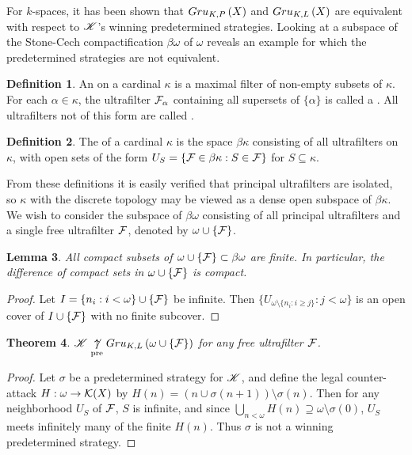 \documentclass{amsart}
\newtheorem{theorem}{Theorem}[section]
\newtheorem{lemma}[theorem]{Lemma}
\theoremstyle{definition}
\newtheorem{definition}[theorem]{Definition}
\begin{document}
For \(k\)-spaces, it has been shown that \(Gru_{K,P}\left({X}\right)\) and \(Gru_{K,L}\left({X}\right)\)
are equivalent with respect to \(\mathscr{K}\)'s winning predetermined strategies.
Looking at a subspace of the Stone-Cech compactification \(\beta\omega\) of
\(\omega\) reveals an example for which the predetermined strategies are not
equivalent.

\begin{definition}
  An  on a cardinal \(\kappa\) is a maximal filter of non-empty
  subsets of \(\kappa\). For each \(\alpha\in \kappa\), the ultrafilter
  \(\mathcal{F}_\alpha\) containing all supersets of \(\{\alpha\}\) is called a
  . All
  ultrafilters not of this form are called .
\end{definition}

\begin{definition}
  The  of a cardinal
  \(\kappa\) is the space \(\beta\kappa\) consisting
  of all ultrafilters on \(\kappa\), with open sets of the form
  \(U_S=\{\mathcal{F}\in\beta\kappa : S\in\mathcal{F}\}\) for \(S\subseteq \kappa\).
\end{definition}

From these definitions it is easily verified that principal ultrafilters
are isolated, so \(\kappa\) with the discrete topology may be viewed as
a dense open subspace of \(\beta\kappa\).
We wish to consider the subspace
of \(\beta\omega\) consisting of all principal ultrafilters and a single free
ultrafilter \(\mathcal{F}\), denoted by \(\omega\cup\{\mathcal{F}\}\).

\begin{lemma}
  All compact subsets of \(\omega\cup\{\mathcal{F}\}\subset\beta\omega\) are finite.
  In particular, the difference of compact sets in \(\omega\cup\{\mathcal{F}\}\)
  is compact.
\end{lemma}

\begin{proof}
  Let \(I=\{n_i:i<\omega\}\cup\{\mathcal{F}\}\) be infinite.
  Then \(\{U_{\omega\setminus\{n_i:i\geq j\}}:j<\omega\}\) is an open cover of
  \(I\cup\{\mathcal{F}\}\) with no finite subcover.
\end{proof}

\begin{theorem}
  \(\mathscr{K}\underset{\text{pre}}{\not\uparrow} Gru_{K,L}\left({\omega\cup\{\mathcal{F}\}}\right)\) for any free
  ultrafilter \(\mathcal{F}\).
\end{theorem}

\begin{proof}
  Let \(\sigma\) be a predetermined strategy for \(\mathscr{K}\), and define the legal
  counter-attack \(H:\omega\to\mathcal{K}(X)\) by
  \(H(n)=(n\cup\sigma(n+1))\setminus\sigma(n)\). Then for any neighborhood
  \(U_S\) of \(\mathcal{F}\), \(S\) is infinite, and since
  \(\bigcup_{n<\omega} H(n)\supseteq\omega\setminus\sigma(0)\), \(U_S\) meets
  infinitely many of the finite \(H(n)\). Thus \(\sigma\) is not a winning
  predetermined strategy.
\end{proof}
\end{document}
